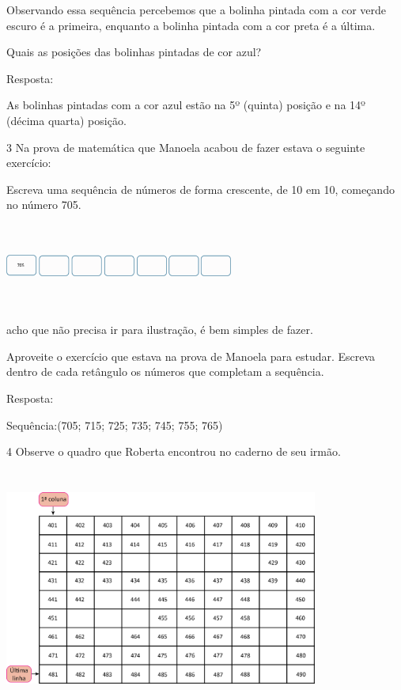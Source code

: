 \begin{escolha}
Observando essa sequência percebemos que a bolinha pintada com a cor
verde escuro é a primeira, enquanto a bolinha pintada com a cor preta é a
última.

Quais as posições das bolinhas pintadas de cor azul?


Resposta:

As bolinhas pintadas com a cor azul estão na 5º (quinta) posição e na
14º (décima quarta) posição.

\num{3} Na prova de matemática que Manoela acabou de fazer estava o seguinte exercício:

Escreva uma sequência de números de forma crescente, de 10 em 10, começando no número 705.

\includegraphics[width=2.95859in,height=1.10010in]{media/image29.png}

 acho que não precisa ir para ilustração, é bem simples de fazer.

Aproveite o exercício que estava na prova de Manoela para estudar.
Escreva dentro de cada retângulo os números que completam a sequência.


Resposta:

Sequência:(705; 715; 725; 735; 745; 755; 765)

\num{4} Observe o quadro que Roberta encontrou no caderno de seu irmão.

\includegraphics[width=4.05869in,height=3.09193in]{media/image30.png}


\end{escolha}
